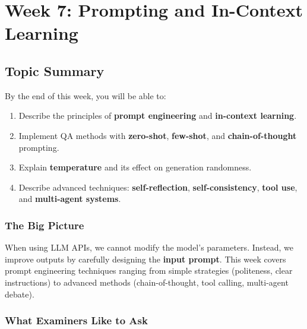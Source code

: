 \section{Week 7: Prompting and In-Context Learning}

\subsection{Topic Summary}

\begin{keybox}
By the end of this week, you will be able to:
\begin{enumerate}
  \item Describe the principles of \textbf{prompt engineering} and \textbf{in-context learning}.
  \item Implement QA methods with \textbf{zero-shot}, \textbf{few-shot}, and \textbf{chain-of-thought} prompting.
  \item Explain \textbf{temperature} and its effect on generation randomness.
  \item Describe advanced techniques: \textbf{self-reflection}, \textbf{self-consistency}, \textbf{tool use}, and \textbf{multi-agent systems}.
\end{enumerate}
\end{keybox}

\separator

\subsubsection*{The Big Picture}

When using LLM APIs, we cannot modify the model's parameters. Instead, we improve outputs by carefully designing the \textbf{input prompt}. This week covers prompt engineering techniques ranging from simple strategies (politeness, clear instructions) to advanced methods (chain-of-thought, tool calling, multi-agent debate).

\separator

\subsubsection*{What Examiners Like to Ask}

